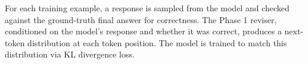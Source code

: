 For each training example, a response is sampled from the model and checked against the ground-truth final answer for correctness. The Phase 1 reviser, conditioned on the model's response and whether it was correct, produces a next-token distribution at each token position. The model is trained to match this distribution via KL divergence loss.
















